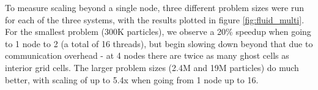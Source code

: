 To measure scaling beyond a single node, three different problem sizes were run for each of the three systems,
 with the results plotted in figure
\ref{fig:fluid_multi}.  For the smallest problem (300K particles), we observe a 20\% speedup when going to 1
node to 2 (a total of 16 threads), but begin slowing down beyond that due to communication overhead - at 4 nodes
there are twice as many ghost cells as interior grid cells.  The larger problem sizes (2.4M and 19M
particles) do much better, with scaling of up to 5.4x when going from 1 node up to 16.


